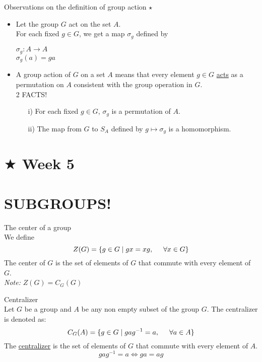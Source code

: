 \documentclass{article}
\begin{document}
\newpage
Observations on the definition of group action \(\star\)
\begin{itemize}
    \item Let the group \(G\) act on the set \(A\).\\
    For each fixed \(g \in G\), we get a map \(\sigma_g\) defined by \begin{center}
        \(\sigma_g: A \xrightarrow{} A\)\\
        \(\sigma_g(a)=ga\)
    \end{center}

    \item A group action of \(G\) on a set \(A\) means that every element \(g \in G\) \underline{acts} as a permutation on \(A\) consistent with the group operation in \(G\).\\ 2 FACTS! \begin{enumerate}
        \item[i)] For each fixed \(g \in G\), \(\sigma_g\) is a permutation of \(A\).
        \item[ii)] The map from \(G\) to \(S_A\) defined by \(g \mapsto \sigma_g\) is a homomorphism.
    \end{enumerate}
\end{itemize}

\newpage
\section*{$\bigstar$ Week 5}
\section*{SUBGROUPS!}

\vspace{0.5cm}
 The center of a group\\
We define \[Z(G)=\{g \in G \mid gx=xg ,\hspace{0.5cm} \forall x \in G\}\]
The center of \(G\) is the set of elements of \(G\) that commute with every element of \(G\).\\
\textit{Note:} \(Z(G)=C_G(G)\)


\vspace{0.5cm}
 Centralizer\\
Let \(G\) be a group and \(A\) be any non empty subset of the group \(G\). The centralizer is denoted as:
\[C_G(A)=\{g \in G \mid gag^{-1}=a, \hspace{0.5cm} \forall a \in A\}\]
The \underline{centralizer} is the set of elements of \(G\) that commute with every element of \(A\).
\[gag^{-1}=a \iff ga=ag\]
\end{document}
